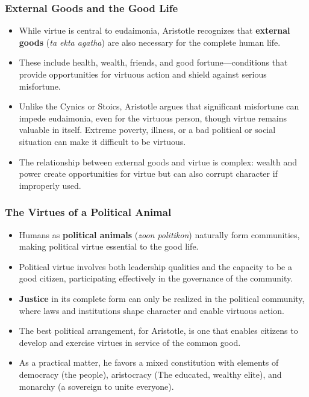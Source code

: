 \documentclass{beamer}
\begin{document}
\begin{frame}
    \frametitle{External Goods and the Good Life}
    \begin{itemize}
        \item While virtue is central to eudaimonia, Aristotle recognizes that \textbf{external goods} (\textit{ta ekta agatha}) are also necessary for the complete human life.
        
        \item These include health, wealth, friends, and good fortune—conditions that provide opportunities for virtuous action and shield against serious misfortune.
        
        \item Unlike the Cynics or Stoics, Aristotle argues that significant misfortune can impede eudaimonia, even for the virtuous person, though virtue remains valuable in itself. Extreme poverty, illness, or a bad political or social situation can make it difficult to be virtuous.
        
        \item The relationship between external goods and virtue is complex: wealth and power create opportunities for virtue but can also corrupt character if improperly used.
    \end{itemize}
\end{frame}

\begin{frame}
    \frametitle{The Virtues of a Political Animal}
    \begin{itemize}
        \item Humans as \textbf{political animals} (\textit{zoon politikon}) naturally form communities, making political virtue essential to the good life.
        
        \item Political virtue involves both leadership qualities and the capacity to be a good citizen, participating effectively in the governance of the community.
        
        \item \textbf{Justice} in its complete form can only be realized in the political community, where laws and institutions shape character and enable virtuous action.
        
        \item The best political arrangement, for Aristotle, is one that enables citizens to develop and exercise virtues in service of the common good. 
        
        \item As a practical matter, he favors a mixed constitution with elements of democracy (the people), aristocracy (The educated, wealthy elite), and monarchy (a sovereign to unite everyone).
    \end{itemize}
\end{frame}
\end{document}
